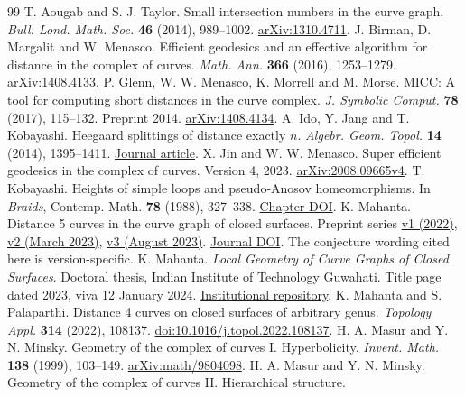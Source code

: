 \documentclass[11pt,a4paper]{article}
\begin{document}
\clearpage
\begin{thebibliography}{99}\small
{} T. Aougab and S. J. Taylor.
Small intersection numbers in the curve graph.
\emph{Bull. Lond. Math. Soc.} \textbf{46} (2014), 989--1002.
\href{https://arxiv.org/abs/1310.4711}{arXiv:1310.4711}.
 J. Birman, D. Margalit and W. Menasco.
Efficient geodesics and an effective algorithm for distance in the complex
of curves. \emph{Math. Ann.} \textbf{366} (2016), 1253--1279.
\href{https://arxiv.org/abs/1408.4133}{arXiv:1408.4133}.
 P. Glenn, W. W. Menasco, K. Morrell and M. Morse.
MICC: A tool for computing short distances in the curve complex.
\emph{J. Symbolic Comput.} \textbf{78} (2017), 115--132. Preprint 2014.
\href{https://arxiv.org/abs/1408.4134}{arXiv:1408.4134}.
 A. Ido, Y. Jang and T. Kobayashi.
Heegaard splittings of distance exactly \(n\).
\emph{Algebr. Geom. Topol.} \textbf{14} (2014), 1395--1411.
\href{https://msp.org/agt/2014/14-3/agt-v14-n3-p06-p.pdf}{Journal article}.
 X. Jin and W. W. Menasco. Super efficient geodesics in
the complex of curves. Version 4, 2023.
\href{https://arxiv.org/pdf/2008.09665v4}{arXiv:2008.09665v4}.
 T. Kobayashi. Heights of simple loops and pseudo-Anosov
homeomorphisms. In \emph{Braids}, Contemp. Math. \textbf{78} (1988),
327--338. \href{https://doi.org/10.1090/conm/078/975087}{Chapter DOI}.
 K. Mahanta. Distance 5 curves in the curve graph of closed
surfaces. Preprint series \href{https://arxiv.org/pdf/2211.15290v1}{v1
(2022)}, \href{https://arxiv.org/pdf/2211.15290v2}{v2 (March 2023)},
\href{https://arxiv.org/pdf/2211.15290v3}{v3 (August 2023)}.
\href{https://doi.org/10.1142/S179352532650007X}{Journal DOI}.
The conjecture wording cited here is version-specific.
 K. Mahanta. \emph{Local Geometry of Curve Graphs of Closed
Surfaces}. Doctoral thesis, Indian Institute of Technology Guwahati.
Title page dated 2023, viva 12 January 2024.
\href{https://gyan.iitg.ac.in/handle/123456789/2544}{Institutional repository}.
 K. Mahanta and S. Palaparthi.
Distance 4 curves on closed surfaces of arbitrary genus.
\emph{Topology Appl.} \textbf{314} (2022), 108137.
\href{https://doi.org/10.1016/j.topol.2022.108137}{doi:10.1016/j.topol.2022.108137}.
 H. A. Masur and Y. N. Minsky.
Geometry of the complex of curves I. Hyperbolicity.
\emph{Invent. Math.} \textbf{138} (1999), 103--149.
\href{https://arxiv.org/abs/math/9804098}{arXiv:math/9804098}.
 H. A. Masur and Y. N. Minsky.
Geometry of the complex of curves II. Hierarchical structure.

\end{thebibliography}
\end{document}

